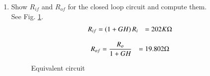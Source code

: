 \begin{enumerate}[label=\arabic*.,ref=\theenumi]
\item Show $R_{if}$ and $R_{of}$ for the closed loop circuit and compute them.
\\
\solution See Fig. \ref{fig:ee18btech11039_fig2}.
%
\begin{align}
    R_{if} &= \left(1+GH\right) R_i
    &= 202K\ohm
\end{align}

\begin{align}
    R_{of} &= \frac{R_o}{1+GH}
           &= 19.802\ohm
\end{align}
\begin{figure}[!h]
		\resizebox{\columnwidth}{!}{}
\caption{Equivalent circuit}
\label{fig:ee18btech11039_fig2}
\end{figure}




\end{enumerate}
